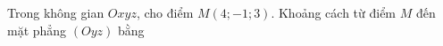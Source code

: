 \begin{ex}
Trong không gian $Oxyz$, cho điểm $M(4;-1;3)$. Khoảng cách từ điểm $M$ đến mặt phẳng $(Oyz)$ bằng
\end{ex}
